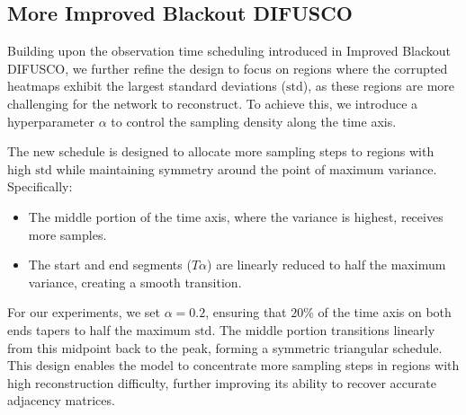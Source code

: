 \subsection{More Improved Blackout DIFUSCO}
Building upon the observation time scheduling introduced in Improved Blackout DIFUSCO, we further refine the design to focus on regions where the corrupted heatmaps exhibit the largest standard deviations (\(\text{std}\)), as these regions are more challenging for the network to reconstruct. To achieve this, we introduce a hyperparameter \(\alpha\) to control the sampling density along the time axis.

The new schedule is designed to allocate more sampling steps to regions with high \(\text{std}\) while maintaining symmetry around the point of maximum variance. Specifically:
\begin{itemize}
    \item The middle portion of the time axis, where the variance is highest, receives more samples.
    \item The start and end segments (\(T \alpha\)) are linearly reduced to half the maximum variance, creating a smooth transition.
\end{itemize}

For our experiments, we set \(\alpha = 0.2\), ensuring that \(20\%\) of the time axis on both ends tapers to half the maximum \(\text{std}\). The middle portion transitions linearly from this midpoint back to the peak, forming a symmetric triangular schedule. This design enables the model to concentrate more sampling steps in regions with high reconstruction difficulty, further improving its ability to recover accurate adjacency matrices.
